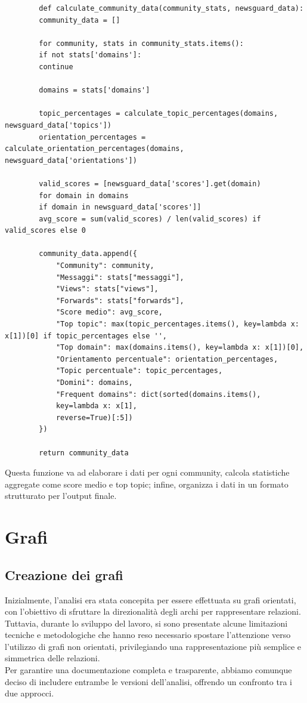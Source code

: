 \documentclass[12pt]{article}
\begin{document}
	\begin{lstlisting}
		def calculate_community_data(community_stats, newsguard_data):
		community_data = []
		
		for community, stats in community_stats.items():
		if not stats['domains']:
		continue
		
		domains = stats['domains']
		
		topic_percentages = calculate_topic_percentages(domains, newsguard_data['topics'])
		orientation_percentages = calculate_orientation_percentages(domains, newsguard_data['orientations'])
		
		valid_scores = [newsguard_data['scores'].get(domain) 
		for domain in domains 
		if domain in newsguard_data['scores']]
		avg_score = sum(valid_scores) / len(valid_scores) if valid_scores else 0
		
		community_data.append({
			"Community": community,
			"Messaggi": stats["messaggi"],
			"Views": stats["views"],
			"Forwards": stats["forwards"],
			"Score medio": avg_score,
			"Top topic": max(topic_percentages.items(), key=lambda x: x[1])[0] if topic_percentages else '',
			"Top domain": max(domains.items(), key=lambda x: x[1])[0],
			"Orientamento percentuale": orientation_percentages,
			"Topic percentuale": topic_percentages,
			"Domini": domains,
			"Frequent domains": dict(sorted(domains.items(), 
			key=lambda x: x[1], 
			reverse=True)[:5])
		})
		
		return community_data
	\end{lstlisting}
	Questa funzione va ad elaborare i dati per ogni community, calcola statistiche aggregate come score medio e top topic; infine, organizza i dati in un formato strutturato per l'output finale.
	\newpage
	\section{Grafi}
	\subsection{Creazione dei grafi}
	Inizialmente, l'analisi era stata concepita per essere effettuata su grafi orientati, con l'obiettivo di sfruttare la direzionalità degli archi per rappresentare relazioni.\\
	Tuttavia, durante lo sviluppo del lavoro, si sono presentate alcune limitazioni tecniche e metodologiche che hanno reso necessario spostare l'attenzione verso l'utilizzo di grafi non orientati, privilegiando una rappresentazione più semplice e simmetrica delle relazioni.\\ 
	Per garantire una documentazione completa e trasparente, abbiamo comunque deciso di includere entrambe le versioni dell'analisi, offrendo un confronto tra i due approcci.
\end{document}
